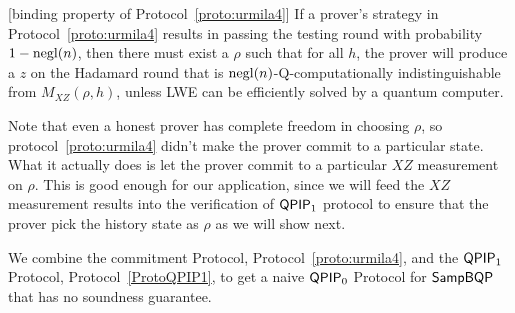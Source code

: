 \begin{lemma}\label{lem:urmila-binding}[binding property of  Protocol~\ref{proto:urmila4}\cite{FOCS:Mahadev18a}]
If a prover's strategy in Protocol~\ref{proto:urmila4} results in passing the testing round with probability $1-\operatorname{negl}(n)$, then there must exist a $\rho$ such that for all $h$, the prover will produce a $z$ on the Hadamard round that is $\operatorname{negl}(n)$-Q-computationally indistinguishable from $M_{XZ}(\rho,h)$, unless LWE can be efficiently solved by a quantum computer. 
\end{lemma}


Note that even a honest prover has complete freedom in choosing $\rho$, so protocol~\ref{proto:urmila4} didn't make the prover commit to a particular state. What it actually does is let the prover commit to a particular $XZ$ measurement on $\rho$. This is good enough for our application, since we will feed the $XZ$ measurement results into the verification of $\operatorname{\mathsf{QPIP}}_1$ protocol to ensure that the prover pick the history state as $\rho$ as we will show next.


We combine the commitment Protocol, Protocol~\ref{proto:urmila4}, and the $\operatorname{\mathsf{QPIP}}_1$ Protocol, Protocol~\ref{ProtoQPIP1}, to get a naive $\operatorname{\mathsf{QPIP}}_0$ Protocol for $\operatorname{\mathsf{SampBQP}}$ that has no soundness guarantee.

